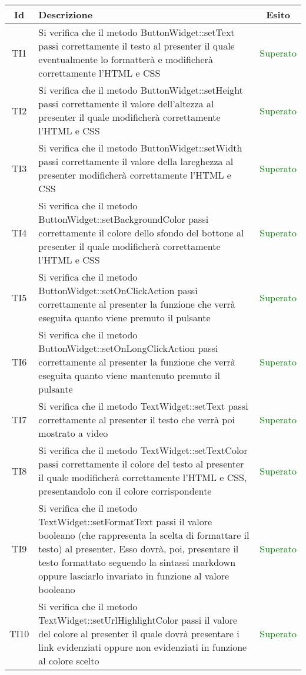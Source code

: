 \begin{center}
	\begin{longtable}{|c|>{\centering}m{10cm}|c|}\hline
		Id & Descrizione & Esito\\ \hline
		TI1 & Si verifica che il metodo ButtonWidget::setText passi correttamente il testo al presenter il quale eventualmente lo formatterà e modificherà correttamente l'HTML e CSS & \textcolor{Green}{Superato}\\ \hline
		TI2 & Si verifica che il metodo ButtonWidget::setHeight passi correttamente il valore dell'altezza al presenter il quale modificherà correttamente l'HTML e CSS & \textcolor{Green}{Superato}\\ \hline
		TI3 & Si verifica che il metodo ButtonWidget::setWidth passi correttamente il valore della lareghezza al presenter modificherà correttamente l'HTML e CSS & \textcolor{Green}{Superato}\\ \hline
		TI4 & Si verifica che il metodo ButtonWidget::setBackgroundColor passi correttamente il colore dello sfondo del bottone al presenter il quale modificherà correttamente l'HTML e CSS & \textcolor{Green}{Superato}\\ \hline
		TI5 & Si verifica che il metodo ButtonWidget::setOnClickAction passi correttamente al presenter la funzione che verrà eseguita quanto viene premuto il pulsante & \textcolor{Green}{Superato}\\ \hline
		TI6 & Si verifica che il metodo ButtonWidget::setOnLongClickAction passi correttamente al presenter la funzione che verrà eseguita quanto viene mantenuto premuto il pulsante & \textcolor{Green}{Superato}\\ \hline
		TI7 & Si verifica che il metodo TextWidget::setText passi correttamente al presenter il testo che verrà poi mostrato a video & \textcolor{Green}{Superato}\\ \hline
		TI8 & Si verifica che il metodo TextWidget::setTextColor passi correttamente il colore del testo al presenter il quale modificherà correttamente l'HTML e CSS, presentandolo con il colore corrispondente & \textcolor{Green}{Superato}\\ \hline
		TI9 & Si verifica che il metodo TextWidget::setFormatText passi il valore booleano (che rappresenta la scelta di formattare il testo) al presenter. Esso dovrà, poi, presentare il testo formattato seguendo la sintassi markdown oppure lasciarlo invariato in funzione al valore booleano & \textcolor{Green}{Superato}\\ \hline
		TI10 & Si verifica che il metodo TextWidget::setUrlHighlightColor passi il valore del colore al presenter il quale dovrà presentare i link evidenziati oppure non evidenziati in funzione al colore scelto & \textcolor{Green}{Superato}\\ \hline

\end{longtable}
\end{center}
